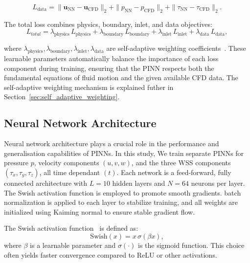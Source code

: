 \documentclass[12pt, a4paper]{article}
\begin{document}
\begin{equation}
L_{\mathrm{data}} = 
\|\mathbf{u}_{\mathrm{NN}} - \mathbf{u}_{\mathrm{CFD}}\|_2 
+ \|p_{\mathrm{NN}} - p_{\mathrm{CFD}}\|_2
+ \|\tau_{\mathrm{NN}} - \tau_{\mathrm{CFD}}\|_2.
\end{equation}

The total loss combines physics, boundary, inlet, and data objectives:
\begin{equation}
L_{total} = 
\lambda_{\mathrm{physics}}\,L_{\mathrm{physics}}
+ \lambda_{\mathrm{boundary}}\,L_{\mathrm{boundary}}
+ \lambda_{\mathrm{inlet}}\,L_{\mathrm{inlet}}
+ \lambda_{\mathrm{data}}\,L_{\mathrm{data}},
\label{eq:total_loss}
\end{equation}

where \(\lambda_{\mathrm{physics}}, \lambda_{\mathrm{boundary}}, \lambda_{\mathrm{inlet}}, \lambda_{\mathrm{data}}\) are self-adaptive weighting coefficients~\citep{mcclenny2020self}. These learnable parameters automatically balance the importance of each loss component during training, ensuring that the PINN respects both the fundamental equations of fluid motion and the given available CFD data. The self-adaptive weighting mechanism is explained futher in Section~\ref{sec:self_adaptive_weighting}. 

\subsection{Neural Network Architecture}
\label{sec:PINN_Architecture_Training}

Neural network architecture plays a crucial role in the performance and generalisation capabilities of PINNs. In this study, We train separate PINNs for pressure $p$, velocity components $(u, v, w)$, and the three WSS components $(\tau_x, \tau_y, \tau_z)$, all time dependant $(t)$. Each network is a feed-forward, fully connected architecture with $L=10$ hidden layers and $N=64$ neurons per layer. The Swish activation function \citep{ramachandran2017searching} is employed to promote smooth gradients. batch normalization is applied to each layer to stabilize training, and all weights are initialized using Kaiming normal \citep{he2015delving} to ensure stable gradient flow.

The Swish activation function~\cite{ramachandran2017searching} is defined as:
\begin{equation}
\mathrm{Swish}(x) = x \,\sigma(\beta x),
\end{equation}
where $\beta$ is a learnable parameter and $\sigma(\cdot)$ is the sigmoid function. This choice often yields faster convergence compared to ReLU or other activations.
\end{document}
